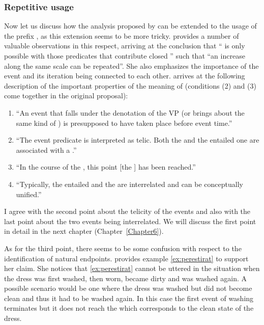 \subsubsection{Repetitive usage}
Now let us discuss how the analysis proposed by \citet{Kagan:book} can be extended to the  usage of the prefix , as this extension seems to be more tricky. \citet[149]{Kagan:book} provides a number of valuable observations in this respect, arriving at the conclusion that ``  is only possible with those predicates that contribute closed ''
such that ``an increase along the same scale can be repeated''. She also emphasizes the importance of the event and its iteration being connected to each other. \citet[148]{Kagan:book} arrives at the following description of the important properties of the  meaning of  (conditions (2) and (3) come together in the original proposal): 
\begin{enumerate}
\item ``An event that falls under the denotation of the VP (or brings about the same kind of ) is presupposed to have taken place before event time.'' 
\item ``The event predicate is interpreted as telic. Both the  and the entailed one are associated with a .'' 
\item ``In the course of the , this point [the ] has been reached.''
\item ``Typically, the entailed and the  are interrelated and can be conceptually unified.''
\end{enumerate}

I agree with the second point about the telicity of the events and also with the last point about the two events being interrelated. We will discuss the first point in detail in the next chapter (Chapter~\ref{Chapter6}). 

As for the third point, there seems to be some confusion with respect to the identification of natural endpoints. \citet{Kagan:book} provides example \ref{ex:perestirat} to support her claim. She notices that \ref{ex:perestirat} cannot be uttered in the situation when the dress was first washed, then worn, became dirty and was washed again. A possible scenario would be one where the dress was washed but did not become clean and thus it had to be washed again. In this case the first event of washing terminates but it does not reach the  which corresponds to the clean state of the dress.

